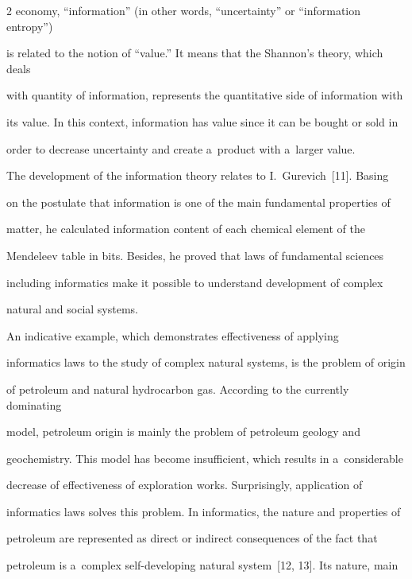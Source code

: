 \begin{multicols}{2}
economy, ``information'' (in other words, ``uncertainty'' or ``information entropy'') 

is related to the notion of ``value.'' It means that the Shannon's theory, which deals 

with quantity of information, represents the quantitative side of information with 

its value. In this context, information has value since it can be bought or sold in 

order to decrease uncertainty and create a~product with a~larger value.

   

   The development of the information theory relates to I.~Gurevich~[11]. Basing 

on the postulate that information is one of the main fundamental properties of 

matter, he calculated information content of each chemical element of the 

Mendeleev table in bits. Besides, he proved that laws of fundamental sciences 

including informatics make it possible to understand development of complex 

natural and social systems.

{



}

   

   An indicative example, which demonstrates effectiveness of applying 

informatics laws to the study of complex natural systems, is the problem of origin 

of petroleum and natural hydrocarbon gas. According to the currently dominating 

model, petroleum origin is mainly the problem of petroleum geology and 

geochemistry. This model has become insufficient, which results in a~considerable 

decrease of effectiveness of exploration works. Surprisingly, application of 

informatics laws solves this problem. In informatics, the nature and properties of 

petroleum are represented as direct or indirect consequences of the fact that 

petroleum is a~complex self-developing natural system~[12, 13]. Its nature, main 


\end{multicols}
